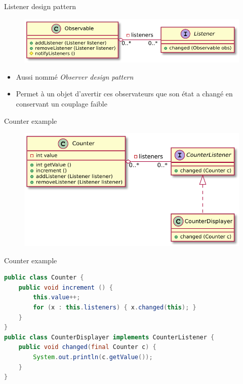 \documentclass[xcolor=table]{beamer}
\begin{document}
\begin{frame}{Listener design pattern}
\begin{figure}
    \centering
    \includegraphics[scale=0.75]{fig/observer-pattern.pdf}
\end{figure}
\begin{itemize}
    \item Aussi nommé \emph{Observer design pattern}
    \item Permet à un objet d'avertir ces observateurs que son état a changé en conservant un couplage faible
\end{itemize}
%
%
\end{frame}

\begin{frame}{Counter example}
\begin{figure}
    \centering
    \includegraphics[scale=0.75]{fig/observable-counter.pdf}
\end{figure}
\end{frame}

\begin{frame}[fragile]{Counter example}
\begin{lstlisting}[language=Java]
public class Counter {
    public void increment () {
        this.value++;
        for (x : this.listeners) { x.changed(this); }
    }
}
public class CounterDisplayer implements CounterListener {
    public void changed(final Counter c) {
        System.out.println(c.getValue());
    }
}
\end{lstlisting}
\end{frame}
\end{document}
